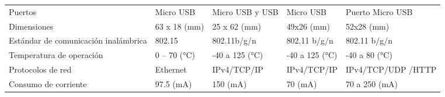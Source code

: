 \begin{longtable}{|p{3cm}|p{2.8cm}|p{2.5cm}|p{2.5cm}|p{2.8cm}|}
	Puertos                              & Micro USB                                       & Micro USB y USB                         & Micro USB                              & Puerto Micro USB                           \\
	Dimensiones                          & 63 x 18 (mm)                                    & 25 x 62 (mm)                            & 49x26 (mm)                             & 52x28 (mm)                                 \\
	Estándar de comunicación inalámbrica & 802.15                                          & 802.11b/g/n                             & 802.11 b/g/n                           & 802.11 b/g/n                               \\
	Temperatura de operación             & 0 – 70 (°C)                                     & -40 a 125 (°C)                          & -40 a 125 (°C)                         & -40 a 80 (°C)                              \\
	Protocolos de red                    & Ethernet                                        & IPv4/TCP/IP                             & IPv4/TCP/IP                            & IPv4/TCP/UDP /HTTP                          \\
	Consumo de corriente                 & 97.5 (mA)                                       & 150 (mA)                                & 70 (mA)                                & 70 a 250 (mA)                              \\
\end{longtable}